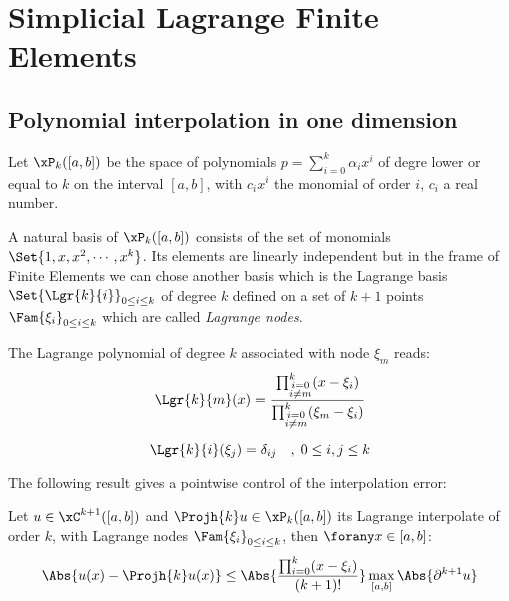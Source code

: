 
\chapter{Simplicial Lagrange Finite Elements}\label{sec:lagrange}

\section{Polynomial interpolation in one dimension}

Let $\xP_k([a,b])$ be the space of polynomials $p = \sum_{i=0}^k \alpha_i x^i$ of degre lower or equal to $k$ on the interval $[a,b]$, with $c_i x^i$ the monomial of order $i$, $c_i$ a real number.

\medskip
A natural basis of $\xP_k([a,b])$ consists of the set of monomials $\Set{1,x,x^2,\cdots,x^k}$.
Its elements are linearly independent but in the frame of Finite Elements we can chose another basis which is the Lagrange basis $\Set{\Lgr{k}{i}}_{0 \leq i \leq k}$ of degree $k$ defined on a set of $k+1$ points $\Fam{\xi_i}_{0 \leq i \leq k}$ which are called \textit{Lagrange nodes}.

\begin{dfntn}
\label{def:lagrange_poly}
The Lagrange polynomial of degree $k$ associated with node $\xi_m$ reads:
\begin{equation*}
\Lgr{k}{m}(x) = \dfrac{\prod_{\substack{i=0\\i\not=m}}^k (x - \xi_i)}{\prod_{\substack{i=0\\i\not=m}}^k (\xi_m - \xi_i)}
\end{equation*}
\end{dfntn}

\begin{prpstn}
\begin{equation*}
\Lgr{k}{i}(\xi_j) = \delta_{ij}\quad,\;0 \leq i,j \leq k
\end{equation*}
\end{prpstn}

\bigskip
The following result gives a pointwise control of the interpolation error:
\begin{thrm}
\label{th:polyinterpol}
Let $u\in\xC^{k+1}([a,b])$ and $\Projh{k} u \in \xP_k([a,b])$ its Lagrange interpolate of order $k$, with Lagrange nodes $\Fam{\xi_i}_{0\leq i \leq k}$, then $\forany x \in [a,b]$:
\begin{equation*}
\Abs{u(x) - \Projh{k} u(x)} \leq \Abs{\dfrac{\prod_{i=0}^k (x - \xi_i)}{(k+1)!}}\max_{[a,b]}\Abs{\partial^{k+1} u}
\end{equation*}
\end{thrm}

